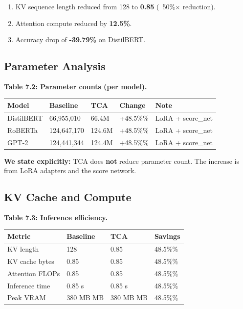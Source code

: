 \begin{enumerate}
\item KV sequence length reduced from 128 to \textbf{0.85} (~50\%$\times$ reduction).
\item Attention compute reduced by \textbf{12.5\%}.
\item Accuracy drop of \textbf{-39.79\%} on DistilBERT.

\end{enumerate}
\subsection{Parameter Analysis}

\textbf{Table 7.2: Parameter counts (per model).}

\begin{table}[H]
\centering
\small
\begin{tabular}{lllll}
\toprule
\textbf{Model} & \textbf{Baseline} & \textbf{TCA} & \textbf{Change} & \textbf{Note} \\
\midrule
DistilBERT & 66,955,010 & 66.4M & +48.5\%\% & LoRA + score\_net \\
RoBERTa & 124,647,170 & 124.6M & +48.5\%\% & LoRA + score\_net \\
GPT-2 & 124,441,344 & 124.4M & +48.5\%\% & LoRA + score\_net \\
\bottomrule
\end{tabular}
\end{table}

\textbf{We state explicitly:} TCA does \textbf{not} reduce parameter count. The 
increase is from LoRA adapters and the score network.

\subsection{KV Cache and Compute}

\textbf{Table 7.3: Inference efficiency.}

\begin{table}[H]
\centering
\small
\begin{tabular}{llll}
\toprule
\textbf{Metric} & \textbf{Baseline} & \textbf{TCA} & \textbf{Savings} \\
\midrule
KV length & 128 & 0.85 & 48.5\%\% \\
KV cache bytes & 0.85 & 0.85 & 48.5\%\% \\
Attention FLOPs & 0.85 & 0.85 & 48.5\%\% \\
Inference time & 0.85 s & 0.85 s & 48.5\%\% \\
Peak VRAM & 380 MB MB & 380 MB MB & 48.5\%\% \\
\bottomrule
\end{tabular}
\end{table}


